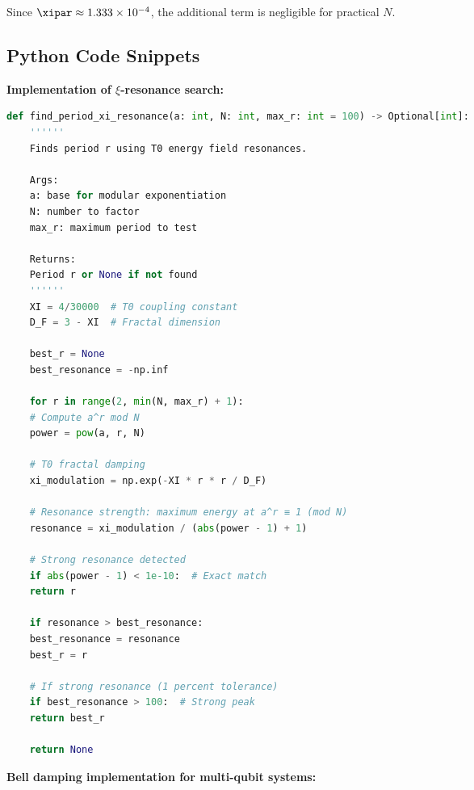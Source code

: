 Since $\xipar \approx 1.333\times 10^{-4}$, the additional term is negligible for practical $N$.

\subsection{Python Code Snippets}
\label{app:code}

\textbf{Implementation of $\xi$-resonance search:}

\begin{lstlisting}[language=Python, caption=$\xi$-resonance algorithm]
	def find_period_xi_resonance(a: int, N: int, max_r: int = 100) -> Optional[int]:
	''''''
	Finds period r using T0 energy field resonances.
	
	Args:
	a: base for modular exponentiation
	N: number to factor
	max_r: maximum period to test
	
	Returns:
	Period r or None if not found
	''''''
	XI = 4/30000  # T0 coupling constant
	D_F = 3 - XI  # Fractal dimension
	
	best_r = None
	best_resonance = -np.inf
	
	for r in range(2, min(N, max_r) + 1):
	# Compute a^r mod N
	power = pow(a, r, N)
	
	# T0 fractal damping
	xi_modulation = np.exp(-XI * r * r / D_F)
	
	# Resonance strength: maximum energy at a^r ≡ 1 (mod N)
	resonance = xi_modulation / (abs(power - 1) + 1)
	
	# Strong resonance detected
	if abs(power - 1) < 1e-10:  # Exact match
	return r
	
	if resonance > best_resonance:
	best_resonance = resonance
	best_r = r
	
	# If strong resonance (1 percent tolerance)
	if best_resonance > 100:  # Strong peak
	return best_r
	
	return None
\end{lstlisting}

\textbf{Bell damping implementation for multi-qubit systems:}

